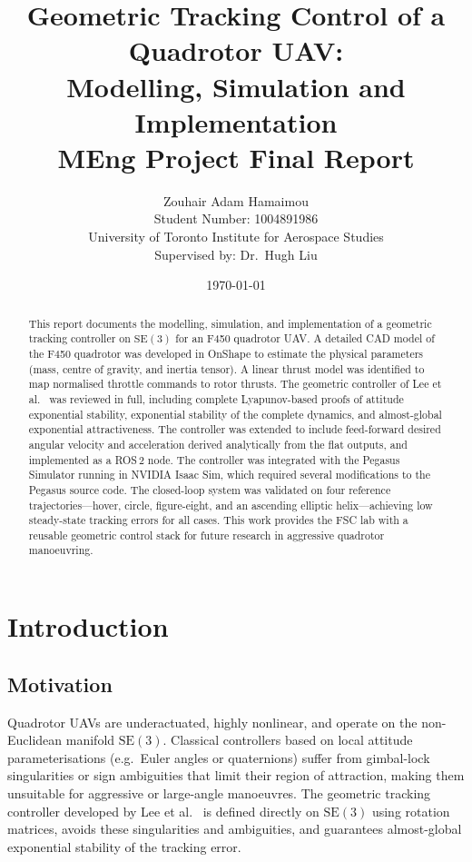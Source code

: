 \documentclass[11pt]{article}
\title{\textbf{Geometric Tracking Control of a Quadrotor UAV:\\
Modelling, Simulation and Implementation}\\[0.4em]
\large MEng Project Final Report}
\author{Zouhair Adam Hamaimou\\
Student Number: 1004891986\\[0.3em]
University of Toronto Institute for Aerospace Studies\\[0.3em]
Supervised by: Dr.~Hugh Liu}
\date{\today}
\theoremstyle{remark}
\newcommand{\se}{\mathrm{SE}(3)}
\begin{document}
\maketitle
\thispagestyle{empty}

\begin{abstract}
\noindent
This report documents the modelling, simulation, and implementation of a geometric tracking controller on $\se$ for an F450 quadrotor UAV. A detailed CAD model of the F450 quadrotor was developed in OnShape to estimate the physical parameters (mass, centre of gravity, and inertia tensor). A linear thrust model was identified to map normalised throttle commands to rotor thrusts. The geometric controller of Lee et al.~\cite{Lee2010CDC} was reviewed in full, including complete Lyapunov-based proofs of attitude exponential stability, exponential stability of the complete dynamics, and almost-global exponential attractiveness. The controller was extended to include feed-forward desired angular velocity and acceleration derived analytically from the flat outputs, and implemented as a ROS\,2 node. The controller was integrated with the Pegasus Simulator running in NVIDIA Isaac Sim, which required several modifications to the Pegasus source code. The closed-loop system was validated on four reference trajectories---hover, circle, figure-eight, and an ascending elliptic helix---achieving low steady-state tracking errors for all cases. This work provides the FSC lab with a reusable geometric control stack for future research in aggressive quadrotor manoeuvring.
\end{abstract}

\newpage

\tableofcontents
\thispagestyle{empty}
\newpage

\section{Introduction}

\subsection{Motivation}
Quadrotor UAVs are underactuated, highly nonlinear, and operate on the non-Euclidean manifold $\se$. Classical controllers based on local attitude parameterisations (e.g.\ Euler angles or quaternions) suffer from gimbal-lock singularities or sign ambiguities that limit their region of attraction, making them unsuitable for aggressive or large-angle manoeuvres. The geometric tracking controller developed by Lee et al.~\cite{Lee2010CDC} is defined directly on $\se$ using rotation matrices, avoids these singularities and ambiguities, and guarantees almost-global exponential stability of the tracking error.
\end{document}
